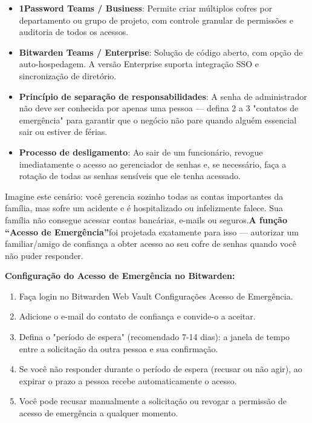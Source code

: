 
\begin{itemize}
  \item \textbf{1Password Teams / Business}: Permite criar múltiplos cofres por departamento ou grupo de projeto, com controle granular de permissões e auditoria de todos os acessos.
  \item \textbf{Bitwarden Teams / Enterprise}: Solução de código aberto, com opção de auto-hospedagem. A versão Enterprise suporta integração SSO e sincronização de diretório.
  \item \textbf{Princípio de separação de responsabilidades}: A senha de administrador não deve ser conhecida por apenas uma pessoa — defina 2 a 3 "contatos de emergência" para garantir que o negócio não pare quando alguém essencial sair ou estiver de férias.
  \item \textbf{Processo de desligamento}: Ao sair de um funcionário, revogue imediatamente o acesso ao gerenciador de senhas e, se necessário, faça a rotação de todas as senhas sensíveis que ele tenha acessado.
\end{itemize}


Imagine este cenário: você gerencia sozinho todas as contas importantes da família, mas sofre um acidente e é hospitalizado ou infelizmente falece. Sua família não consegue acessar contas bancárias, e-mails ou seguros.\textbf{A função “Acesso de Emergência”}foi projetada exatamente para isso — autorizar um familiar/amigo de confiança a obter acesso ao seu cofre de senhas quando você não puder responder.

\textbf{Configuração do Acesso de Emergência no Bitwarden:}

\begin{enumerate}
  \item Faça login no Bitwarden Web Vault Configurações Acesso de Emergência.
  \item Adicione o e-mail do contato de confiança e convide-o a aceitar.
  \item Defina o "período de espera" (recomendado 7-14 dias): a janela de tempo entre a solicitação da outra pessoa e sua confirmação.
  \item Se você não responder durante o período de espera (recusar ou não agir), ao expirar o prazo a pessoa recebe automaticamente o acesso.
  \item Você pode recusar manualmente a solicitação ou revogar a permissão de acesso de emergência a qualquer momento.
\end{enumerate}

